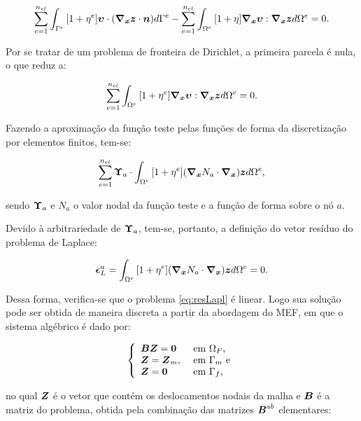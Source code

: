 \begin{equation}
    \sum_{e=1}^{n_{el}}{\int_{\Gamma^e}{[1+\eta^e]\boldsymbol{\upsilon}\cdot(\boldsymbol{\nabla_x}\boldsymbol{z}\cdot\boldsymbol{n}) d\Gamma^e}}-\sum_{e=1}^{n_{el}}{\int_{\Omega^e}{[1+\eta]\boldsymbol{\nabla_x}\boldsymbol{\upsilon}:\boldsymbol{\nabla_x}\boldsymbol{z} d\Omega^e}}=0\text{.}
\end{equation}

Por se tratar de um problema de fronteira de Dirichlet, a primeira parcela é nula, o que reduz a:

\begin{equation}
    \sum_{e=1}^{n_{el}}{\int_{\Omega^e}{[1+\eta^e]\boldsymbol{\nabla_x}\boldsymbol{\upsilon}:\boldsymbol{\nabla_x}\boldsymbol{z} d\Omega^e}}=0\text{.}
\end{equation}

Fazendo a aproximação da função teste pelas funções de forma da discretização por elementos finitos, tem-se:

\begin{equation}
    \sum_{e=1}^{n_{el}}{\boldsymbol{\Upsilon}_a\cdot\int_{\Omega^e}{[1+\eta^e](\boldsymbol{\nabla_x} N_a\cdot\boldsymbol{\nabla_x})\boldsymbol{z} d\Omega^e}}\text{,}
\end{equation}

\noindent sendo $\boldsymbol{\Upsilon}_a$ e $N_a$ o valor nodal da função teste e a função de forma sobre o nó $a$.

Devido à arbitrariedade de $\boldsymbol{\Upsilon}_a$, tem-se, portanto, a definição do vetor resíduo do problema de Laplace:

\begin{equation}
    \boldsymbol{\epsilon}_L^a=\int_{\Omega^e}{[1+\eta^e](\boldsymbol{\nabla_x} N_a\cdot\boldsymbol{\nabla_x})\boldsymbol{z} d\Omega^e}=0\text{.}
    \label{eq:resLapl}
\end{equation}

Dessa forma, verifica-se que o problema \eqref{eq:resLapl} é linear. Logo sua solução pode ser obtida de maneira discreta a partir da abordagem do MEF, em que o sistema algébrico é dado por:

\begin{equation}
    \left\{
    \begin{array}{ll}
        \boldsymbol{B}\boldsymbol{Z}=\boldsymbol{0}     & \text{ em }\Omega_F\text{,}  \\
        \boldsymbol{Z}=\boldsymbol{Z}_m\text{,} & \text{ em }\Gamma_m\text{ e} \\
        \boldsymbol{Z}=\boldsymbol{0}           & \text{ em }\Gamma_f\text{,}
    \end{array}
    \right.\label{eq:LaplMov}
\end{equation}

\noindent no qual $\boldsymbol{Z}$ é o vetor que contém os deslocamentos nodais da malha e $\boldsymbol{B}$ é a matriz do problema, obtida pela combinação das matrizes $\boldsymbol{B}^{ab}$ elementares:

